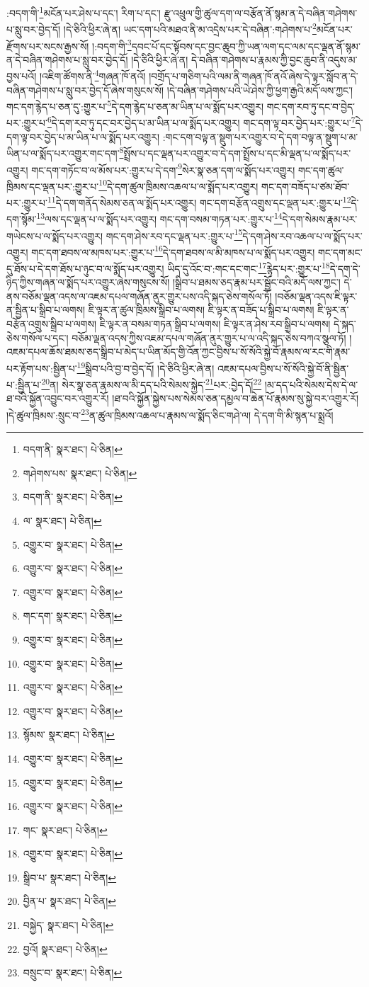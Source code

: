 :བདག་གི་\footnote{བདག་ནི་  སྣར་ཐང་།  པེ་ཅིན། }མངོན་པར་ཤེས་པ་དང་། རིག་པ་དང་། རྫུ་འཕྲུལ་གྱི་ཚུལ་དག་ལ་བརྩོན་ནོ་སྙམ་ན་དེ་བཞིན་གཤེགས་པ་སླུ་བར་བྱེད་དོ། །དེ་ཅིའི་ཕྱིར་ཞེ་ན། ཡང་དག་པའི་མཐའ་ནི་མ་འདྲེས་པར་དེ་བཞིན་:གཤེགས་པ་\footnote{གཤེགས་པས་  སྣར་ཐང་།  པེ་ཅིན། }མངོན་པར་རྫོགས་པར་སངས་རྒྱས་སོ། །:བདག་གི་\footnote{བདག་ནི་  སྣར་ཐང་།  པེ་ཅིན། }དབང་པོ་དང་སྟོབས་དང་བྱང་ཆུབ་ཀྱི་ཡན་ལག་དང་ལམ་དང་ལྡན་ནོ་སྙམ་ན་དེ་བཞིན་གཤེགས་པ་སླུ་བར་བྱེད་དོ། །དེ་ཅིའི་ཕྱིར་ཞེ་ན། དེ་བཞིན་གཤེགས་པ་རྣམས་ཀྱི་བྱང་ཆུབ་ནི་འདུས་མ་བྱས་པའོ། །འཇིག་ཚོགས་ནི་\footnote{ལ་  སྣར་ཐང་།  པེ་ཅིན། }གཞན་ཁོ་ནའོ། །བགྲོད་པ་གཅིག་པའི་ལམ་ནི་གཞན་ཁོ་ནའོ་ཞེས་དེ་ལྟར་སློབ་ན་དེ་བཞིན་གཤེགས་པ་སླུ་བར་བྱེད་དོ་ཞེས་གསུངས་སོ། །དེ་བཞིན་གཤེགས་པའི་ཡེ་ཤེས་ཀྱི་ཕྱག་རྒྱའི་མདོ་ལས་ཀྱང་། གང་དག་རྙེད་པ་ཅན་དུ་:གྱུར་པ་\footnote{འགྱུར་བ་  སྣར་ཐང་།  པེ་ཅིན། }དེ་དག་རྙེད་པ་ཅན་མ་ཡིན་པ་ལ་སྨོད་པར་འགྱུར། གང་དག་རབ་ཏུ་དང་བ་བྱེད་པར་:གྱུར་པ་\footnote{འགྱུར་བ་  སྣར་ཐང་།  པེ་ཅིན། }དེ་དག་རབ་ཏུ་དང་བར་བྱེད་པ་མ་ཡིན་པ་ལ་སྨོད་པར་འགྱུར། གང་དག་ལྟ་བར་བྱེད་པར་:གྱུར་པ་\footnote{འགྱུར་བ་  སྣར་ཐང་།  པེ་ཅིན། }དེ་དག་ལྟ་བར་བྱེད་པ་མ་ཡིན་པ་ལ་སྨོད་པར་འགྱུར། :གང་དག་བལྟ་ན་སྡུག་པར་འགྱུར་བ་དེ་དག་བལྟ་ན་སྡུག་པ་མ་ཡིན་པ་ལ་སྨོད་པར་འགྱུར་གང་དག་\footnote{གང་དག་  སྣར་ཐང་།  པེ་ཅིན། }སྤྲོས་པ་དང་ལྡན་པར་འགྱུར་བ་དེ་དག་སྤྲོས་པ་དང་མི་ལྡན་པ་ལ་སྨོད་པར་འགྱུར། གང་དག་གཏོང་བ་ལ་མོས་པར་:གྱུར་པ་དེ་དག་\footnote{འགྱུར་བ་  སྣར་ཐང་།  པེ་ཅིན། }སེར་སྣ་ཅན་དག་ལ་སྨོད་པར་འགྱུར། གང་དག་ཚུལ་ཁྲིམས་དང་ལྡན་པར་:གྱུར་པ་\footnote{འགྱུར་བ་  སྣར་ཐང་།  པེ་ཅིན། }དེ་དག་ཚུལ་ཁྲིམས་འཆལ་པ་ལ་སྨོད་པར་འགྱུར། གང་དག་བཟོད་པ་ཙམ་ཐོབ་པར་:གྱུར་པ་\footnote{འགྱུར་བ་  སྣར་ཐང་།  པེ་ཅིན། }དེ་དག་གནོད་སེམས་ཅན་ལ་སྨོད་པར་འགྱུར། གང་དག་བརྩོན་འགྲུས་དང་ལྡན་པར་:གྱུར་པ་\footnote{འགྱུར་བ་  སྣར་ཐང་།  པེ་ཅིན། }དེ་དག་སྙོམ་\footnote{སྙོམས་  སྣར་ཐང་།  པེ་ཅིན། }ལས་དང་ལྡན་པ་ལ་སྨོད་པར་འགྱུར། གང་དག་བསམ་གཏན་པར་:གྱུར་པ་\footnote{འགྱུར་བ་  སྣར་ཐང་།  པེ་ཅིན། }དེ་དག་སེམས་རྣམ་པར་གཡེངས་པ་ལ་སྨོད་པར་འགྱུར། གང་དག་ཤེས་རབ་དང་ལྡན་པར་:གྱུར་པ་\footnote{འགྱུར་བ་  སྣར་ཐང་།  པེ་ཅིན། }དེ་དག་ཤེས་རབ་འཆལ་པ་ལ་སྨོད་པར་འགྱུར། གང་དག་ཐབས་ལ་མཁས་པར་:གྱུར་པ་\footnote{འགྱུར་བ་  སྣར་ཐང་།  པེ་ཅིན། }དེ་དག་ཐབས་ལ་མི་མཁས་པ་ལ་སྨོད་པར་འགྱུར། གང་དག་མང་དུ་ཐོས་པ་དེ་དག་ཐོས་པ་ཉུང་བ་ལ་སྨོད་པར་འགྱུར། ཡིད་དུ་འོང་བ་:གང་དང་གང་\footnote{གང་  སྣར་ཐང་།  པེ་ཅིན། }རྙེད་པར་:གྱུར་པ་\footnote{འགྱུར་བ་  སྣར་ཐང་།  པེ་ཅིན། }དེ་དག་དེ་ཉིད་ཀྱིས་གཞན་ལ་སྨོད་པར་འགྱུར་ཞེས་གསུངས་སོ། །སྒྲིབ་པ་ཐམས་ཅད་རྣམ་པར་སྦྱོང་བའི་མདོ་ལས་ཀྱང་། དེ་ནས་བཅོམ་ལྡན་འདས་ལ་འཇམ་དཔལ་གཞོན་ནུར་གྱུར་པས་འདི་སྐད་ཅེས་གསོལ་ཏོ། །བཅོམ་ལྡན་འདས་ཇི་ལྟར་ན་སྦྱིན་པ་སྒྲིབ་པ་ལགས། ཇི་ལྟར་ན་ཚུལ་ཁྲིམས་སྒྲིབ་པ་ལགས། ཇི་ལྟར་ན་བཟོད་པ་སྒྲིབ་པ་ལགས། ཇི་ལྟར་ན་བརྩོན་འགྲུས་སྒྲིབ་པ་ལགས། ཇི་ལྟར་ན་བསམ་གཏན་སྒྲིབ་པ་ལགས། ཇི་ལྟར་ན་ཤེས་རབ་སྒྲིབ་པ་ལགས། དེ་སྐད་ཅེས་གསོལ་པ་དང་། བཅོམ་ལྡན་འདས་ཀྱིས་འཇམ་དཔལ་གཞོན་ནུར་གྱུར་པ་ལ་འདི་སྐད་ཅེས་བཀའ་སྩལ་ཏོ། །འཇམ་དཔལ་ཆོས་ཐམས་ཅད་སྒྲིབ་པ་མེད་པ་ཡིན་མོད་གྱི་འོན་ཀྱང་བྱིས་པ་སོ་སོའི་སྐྱེ་བོ་རྣམས་ལ་རང་གི་རྣམ་པར་རྟོག་པས་:སྦྱིན་པ་\footnote{སྒྲིབ་པ་  སྣར་ཐང་།  པེ་ཅིན། }སྒྲིབ་པའི་བྱ་བ་བྱེད་དོ། །དེ་ཅིའི་ཕྱིར་ཞེ་ན། འཇམ་དཔལ་བྱིས་པ་སོ་སོའི་སྐྱེ་བོ་ནི་སྦྱིན་པ་:སྦྱིན་པ་\footnote{བྱིན་པ་  སྣར་ཐང་།  པེ་ཅིན། }ན། སེར་སྣ་ཅན་རྣམས་ལ་མི་དད་པའི་སེམས་སྐྱེད་\footnote{བསྐྱེད་  སྣར་ཐང་།  པེ་ཅིན། }པར་:བྱེད་དོ།\footnote{བྱའོ།  སྣར་ཐང་།  པེ་ཅིན། } །མ་དད་པའི་སེམས་དེས་དེ་ལ་ཐ་བའི་སྐྱོན་འབྱུང་བར་འགྱུར་རོ། །ཐ་བའི་སྐྱོན་སྐྱེས་པས་སེམས་ཅན་དམྱལ་བ་ཆེན་པོ་རྣམས་སུ་སྐྱེ་བར་འགྱུར་རོ། །དེ་ཚུལ་ཁྲིམས་:སྲུང་བ་\footnote{བསྲུང་བ་  སྣར་ཐང་།  པེ་ཅིན། }ན་ཚུལ་ཁྲིམས་འཆལ་པ་རྣམས་ལ་སྨོད་ཅིང་གཤེ་ལ། དེ་དག་གི་མི་སྙན་པ་སྨྲའོ། 